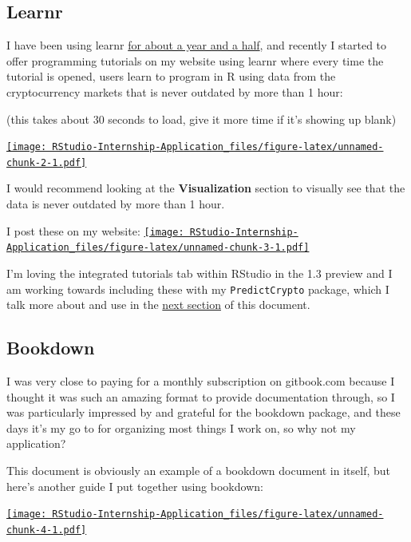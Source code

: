 \documentclass[
]{book}
\begin{document}
\hypertarget{learnr}{%
\subsection{Learnr}\label{learnr}}

I have been using learnr \href{https://github.com/ries9112/R-Tutorial}{for about a year and a half}, and recently I started to offer programming tutorials on my website using learnr where every time the tutorial is opened, users learn to program in R using data from the cryptocurrency markets that is never outdated by more than 1 hour:

(this takes about 30 seconds to load, give it more time if it's showing up blank)

\href{https://predictcrypto.shinyapps.io/R_Basics/}{\texttt{[image: RStudio-Internship-Application\_files/figure-latex/unnamed-chunk-2-1.pdf]}}

I would recommend looking at the \textbf{Visualization} section to visually see that the data is never outdated by more than 1 hour.

I post these on my website:
\href{https://predictcrypto.com/tutorials}{\texttt{[image: RStudio-Internship-Application\_files/figure-latex/unnamed-chunk-3-1.pdf]}}

I'm loving the integrated tutorials tab within RStudio in the 1.3 preview and I am working towards including these with my \texttt{PredictCrypto} package, which I talk more about and use in the \protect\hyperlink{ideal-projects}{next section} of this document.

\hypertarget{bookdown}{%
\subsection{Bookdown}\label{bookdown}}

I was very close to paying for a monthly subscription on gitbook.com because I thought it was such an amazing format to provide documentation through, so I was particularly impressed by and grateful for the bookdown \citep{R-bookdown} package, and these days it's my go to for organizing most things I work on, so why not my application?

This document is obviously an example of a bookdown document in itself, but here's another guide I put together using bookdown:

\href{https://predictcryptodb-quickstart.com/}{\texttt{[image: RStudio-Internship-Application\_files/figure-latex/unnamed-chunk-4-1.pdf]}}
\end{document}
